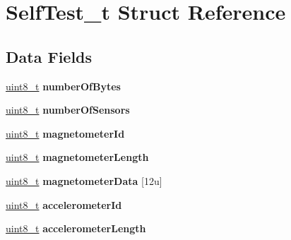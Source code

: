 \hypertarget{struct_self_test__t}{\section{Self\-Test\-\_\-t Struct Reference}
\label{struct_self_test__t}
}
\subsection*{Data Fields}
\begin{DoxyCompactItemize}
\item 
\hypertarget{struct_self_test__t_a85447c46a40fabe0e6eb5497cc76e2fd}{\hyperlink{_project_types_8h_aba7bc1797add20fe3efdf37ced1182c5}{uint8\-\_\-t} {\bfseries number\-Of\-Bytes}}\label{struct_self_test__t_a85447c46a40fabe0e6eb5497cc76e2fd}

\item 
\hypertarget{struct_self_test__t_aea8fb034bd4664a4d6dc9150a53df40f}{\hyperlink{_project_types_8h_aba7bc1797add20fe3efdf37ced1182c5}{uint8\-\_\-t} {\bfseries number\-Of\-Sensors}}\label{struct_self_test__t_aea8fb034bd4664a4d6dc9150a53df40f}

\item 
\hypertarget{struct_self_test__t_a316dbc1ab1f7e0ea807ef55aa4d4196f}{\hyperlink{_project_types_8h_aba7bc1797add20fe3efdf37ced1182c5}{uint8\-\_\-t} {\bfseries magnetometer\-Id}}\label{struct_self_test__t_a316dbc1ab1f7e0ea807ef55aa4d4196f}

\item 
\hypertarget{struct_self_test__t_ad32270566a159ba922711a98eef3ce36}{\hyperlink{_project_types_8h_aba7bc1797add20fe3efdf37ced1182c5}{uint8\-\_\-t} {\bfseries magnetometer\-Length}}\label{struct_self_test__t_ad32270566a159ba922711a98eef3ce36}

\item 
\hypertarget{struct_self_test__t_a32f214a35689cce4c69771e0aaf483ef}{\hyperlink{_project_types_8h_aba7bc1797add20fe3efdf37ced1182c5}{uint8\-\_\-t} {\bfseries magnetometer\-Data} \mbox{[}12u\mbox{]}}\label{struct_self_test__t_a32f214a35689cce4c69771e0aaf483ef}

\item 
\hypertarget{struct_self_test__t_a4bdf449bf55ad41d91a2df5d1594ba54}{\hyperlink{_project_types_8h_aba7bc1797add20fe3efdf37ced1182c5}{uint8\-\_\-t} {\bfseries accelerometer\-Id}}\label{struct_self_test__t_a4bdf449bf55ad41d91a2df5d1594ba54}

\item 
\hypertarget{struct_self_test__t_a1e44737d2ef5b56f2b1c4461d7f2eb32}{\hyperlink{_project_types_8h_aba7bc1797add20fe3efdf37ced1182c5}{uint8\-\_\-t} {\bfseries accelerometer\-Length}}\label{struct_self_test__t_a1e44737d2ef5b56f2b1c4461d7f2eb32}


\end{DoxyCompactItemize}
